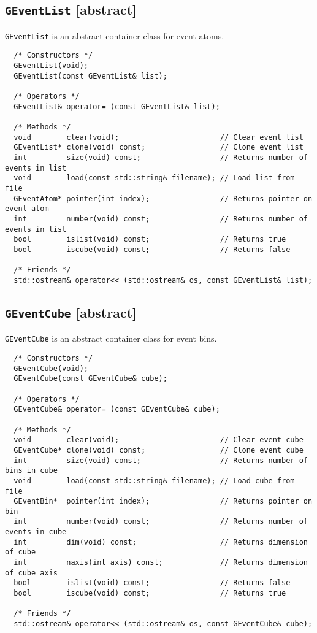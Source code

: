 \documentclass{article}[12pt,a4]
\begin{document}
\subsection{{\tt GEventList} \small[abstract]}
\label{GEventList}
{\tt GEventList} is an abstract container class for event atoms.
\begin{verbatim}
  /* Constructors */
  GEventList(void);
  GEventList(const GEventList& list);

  /* Operators */
  GEventList& operator= (const GEventList& list);
  
  /* Methods */
  void        clear(void);                       // Clear event list
  GEventList* clone(void) const;                 // Clone event list
  int         size(void) const;                  // Returns number of events in list
  void        load(const std::string& filename); // Load list from file
  GEventAtom* pointer(int index);                // Returns pointer on event atom
  int         number(void) const;                // Returns number of events in list
  bool        islist(void) const;                // Returns true
  bool        iscube(void) const;                // Returns false
  
  /* Friends */
  std::ostream& operator<< (std::ostream& os, const GEventList& list);
\end{verbatim}


\subsection{{\tt GEventCube} \small[abstract]}
\label{GEventCube}
{\tt GEventCube} is an abstract container class for event bins.
\begin{verbatim}
  /* Constructors */
  GEventCube(void);
  GEventCube(const GEventCube& cube);

  /* Operators */
  GEventCube& operator= (const GEventCube& cube);
  
  /* Methods */
  void        clear(void);                       // Clear event cube
  GEventCube* clone(void) const;                 // Clone event cube
  int         size(void) const;                  // Returns number of bins in cube
  void        load(const std::string& filename); // Load cube from file
  GEventBin*  pointer(int index);                // Returns pointer on bin
  int         number(void) const;                // Returns number of events in cube
  int         dim(void) const;                   // Returns dimension of cube
  int         naxis(int axis) const;             // Returns dimension of cube axis
  bool        islist(void) const;                // Returns false
  bool        iscube(void) const;                // Returns true
  
  /* Friends */
  std::ostream& operator<< (std::ostream& os, const GEventCube& cube);
\end{verbatim}
\end{document}

